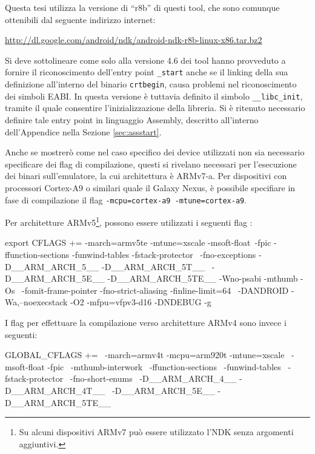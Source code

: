 Questa tesi utilizza la versione di ``r8b'' di questi tool, che sono comunque
ottenibili dal seguente indirizzo internet:
\begin{center}
\url{http://dl.google.com/android/ndk/android-ndk-r8b-linux-x86.tar.bz2}
\end{center}
Si deve sottolineare come solo alla versione 4.6 dei tool hanno provveduto
a fornire il riconoscimento dell'entry point \texttt{\small \_start} anche se il
linking della sua definizione all'interno del binario \texttt{\small crtbegin}, 
causa problemi nel riconoscimento dei simboli EABI.
In questa versione
 è tuttavia definito il simbolo \texttt{\small{\_\_libc\_init}}, tramite il quale
 consentire l'inizializzazione della libreria. Si è ritenuto
necessario definire tale entry point in linguaggio Assembly, descritto all'interno
dell'Appendice nella Sezione \vref{sec:assstart}.

Anche se mostrerò come nel caso specifico dei device utilizzati non sia necessario
specificare dei flag di compilazione, 
questi  si rivelano necessari per l'esecuzione dei binari sull'emulatore, la cui
architettura è ARMv7-a. Per dispositivi con processori Cortex-A9 o similari quale il Galaxy Nexus, è 
possibile specifiare in fase di compilazione il flag 
\texttt{\small -mcpu=cortex-a9 -mtune=cortex-a9}.

Per architetture ARMv5\footnote{Su alcuni dispositivi 
ARMv7 può essere utilizzato l'NDK senza argomenti aggiuntivi.}, possono
essere utilizzati i seguenti flag \parencite{slide:aporting}:
\begin{bash}
export CFLAGS += -march=armv5te -mtune=xscale -msoft-float\
		 -fpic -ffunction-sections -funwind-tables -fstack-protector \
		 -fno-exceptions -D__ARM_ARCH_5__ -D__ARM_ARCH_5T__ \
		 -D__ARM_ARCH_5E__ -D__ARM_ARCH_5TE__  -Wno-psabi -mthumb -Os \
		 -fomit-frame-pointer -fno-strict-aliasing -finline-limit=64 \
		 -DANDROID  -Wa,--noexecstack -O2 -mfpu=vfpv3-d16 -DNDEBUG -g 
\end{bash}

I flag per effettuare la compilazione verso architetture ARMv4 sono invece i seguenti:
\begin{bash}
GLOBAL_CFLAGS += \
	-march=armv4t -mcpu=arm920t -mtune=xscale \
	-msoft-float -fpic \
	-mthumb-interwork \
	-ffunction-sections \
	-funwind-tables \
	-fstack-protector \
	-fno-short-enums \
	-D__ARM_ARCH_4__ -D__ARM_ARCH_4T__ \
	-D__ARM_ARCH_5E__ -D__ARM_ARCH_5TE__ 
\end{bash}



